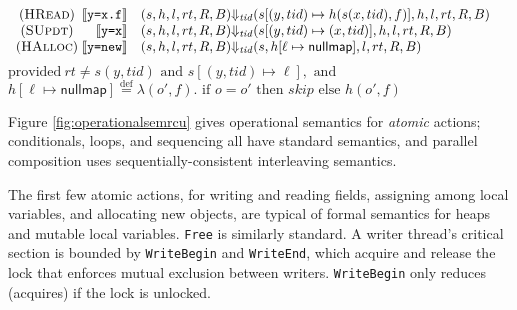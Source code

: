 \begin{figure*}
\[\begin{array}{c@{\;}rl@{\Downarrow_{\mathit{tid}}}ll}
(\textsc{HRead})   & \llbracket\texttt{y=x.f}\rrbracket   &(s,h,l,rt,R,B)& (s[(y,tid) \mapsto h(s(x,tid),f)],h,l,rt,R,B) & \\
(\textsc{SUpdt}) & \llbracket\texttt{y=x}\rrbracket     &(s,h,l,rt,R,B)& (s[(y,tid) \mapsto (x,tid)],h,l,rt,R,B) &\\
(\textsc{HAlloc}) & \llbracket\texttt{y=new}\rrbracket &(s,h,l,rt,R,B)& (s,h[\ell\mapsto\mathsf{nullmap}],l,rt,R,B) & 
\end{array}\]
$  \textrm{provided}~ rt \neq s(y,tid) \textrm{ and } s[(y,tid) \mapsto \ell], \textrm{ and }$
$h[\ell \mapsto \mathsf{nullmap}] \overset{\mathrm{def}}{=} \lambda (o',f) . \textrm{ if } o=o' \textrm{ then } skip \textrm{ else } h(o',f)$
\caption{Operational Semantics for \textsf{RCU}}
\label{fig:operationalsemrcu}
\vspace{-2mm}
\end{figure*}%

Figure \ref{fig:operationalsemrcu} gives operational semantics for \emph{atomic} actions; conditionals, loops, and sequencing all have standard semantics, and parallel composition uses sequentially-consistent interleaving semantics.

The first few atomic actions, for writing and reading fields, assigning among local variables, and allocating new objects, are typical of formal semantics for heaps and mutable local variables. \lstinline|Free| is similarly standard.
%
A writer thread's critical section is bounded by \lstinline|WriteBegin| and \lstinline|WriteEnd|, which acquire and release the lock that enforces mutual exclusion between writers.  \lstinline|WriteBegin| only reduces (acquires) if the lock is \textsf{unlocked}.

